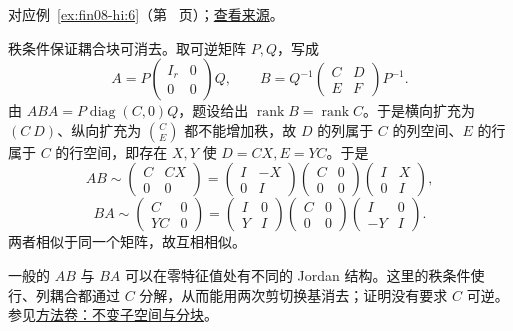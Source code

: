 \documentclass[UTF8,12pt,a4paper,fontset=fandol]{ctexart}
\begin{document}
对应例~\ref{ex:fin08-hi:6}（第~\pageref{ex:fin08-hi:6} 页）；\href{https://github.com/lzxcr/cmc-mathematics/blob/64916fa1fdbc3e444a652eca204d5669058ee321/src/problems/finals/08/06.md}{查看来源}。

\begin{solve}

秩条件保证耦合块可消去。取可逆矩阵 $P,Q$，写成
\[
A=P\begin{pmatrix}I_r&0\\0&0\end{pmatrix}Q,\qquad
B=Q^{-1}\begin{pmatrix}C&D\\E&F\end{pmatrix}P^{-1}.
\]
由 $ABA=P\operatorname{diag}(C,0)Q$，题设给出 $\operatorname{rank}B=\operatorname{rank}C$。于是横向扩充为 $(C\ D)$、纵向扩充为 $\binom CE$ 都不能增加秩，故 $D$ 的列属于 $C$ 的列空间、$E$ 的行属于 $C$ 的行空间，即存在 $X,Y$ 使 $D=CX,E=YC$。于是
\[
AB\sim\begin{pmatrix}C&CX\\0&0\end{pmatrix}
=\begin{pmatrix}I&-X\\0&I\end{pmatrix}\begin{pmatrix}C&0\\0&0\end{pmatrix}\begin{pmatrix}I&X\\0&I\end{pmatrix},
\]
\[
BA\sim\begin{pmatrix}C&0\\YC&0\end{pmatrix}
=\begin{pmatrix}I&0\\Y&I\end{pmatrix}\begin{pmatrix}C&0\\0&0\end{pmatrix}\begin{pmatrix}I&0\\-Y&I\end{pmatrix}.
\]
两者相似于同一个矩阵，故互相相似。

\end{solve}

\begin{remark}[方法与条件]

一般的 $AB$ 与 $BA$ 可以在零特征值处有不同的 Jordan 结构。这里的秩条件使行、列耦合都通过 $C$ 分解，从而能用两次剪切换基消去；证明没有要求 $C$ 可逆。参见\hyperref[app:linear-invariant]{方法卷：不变子空间与分块}。

\end{remark}
\end{document}
